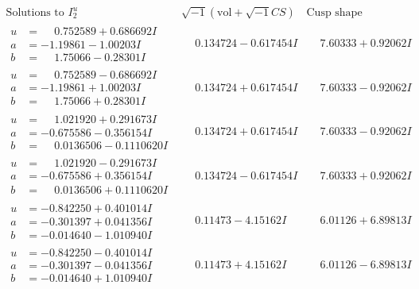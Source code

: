 \documentclass[1p]{elsarticle_modified}
\theoremstyle{definition}
\newcommand{\I}{\sqrt{-1}}
\begin{document}
$$\begin{array}{c|c|c}  
\text{Solutions to }I^u_{2}& \I (\text{vol} + \sqrt{-1}CS) & \text{Cusp shape}\\
 \hline 
\begin{aligned}
u &= \phantom{-}0.752589 + 0.686692 I \\
a &= -1.19861 - 1.00203 I \\
b &= \phantom{-}1.75066 - 0.28301 I\end{aligned}
 & \phantom{-}0.134724 - 0.617454 I & \phantom{-}7.60333 + 0.92062 I \\ \hline\begin{aligned}
u &= \phantom{-}0.752589 - 0.686692 I \\
a &= -1.19861 + 1.00203 I \\
b &= \phantom{-}1.75066 + 0.28301 I\end{aligned}
 & \phantom{-}0.134724 + 0.617454 I & \phantom{-}7.60333 - 0.92062 I \\ \hline\begin{aligned}
u &= \phantom{-}1.021920 + 0.291673 I \\
a &= -0.675586 - 0.356154 I \\
b &= \phantom{-}0.0136506 - 0.1110620 I\end{aligned}
 & \phantom{-}0.134724 + 0.617454 I & \phantom{-}7.60333 - 0.92062 I \\ \hline\begin{aligned}
u &= \phantom{-}1.021920 - 0.291673 I \\
a &= -0.675586 + 0.356154 I \\
b &= \phantom{-}0.0136506 + 0.1110620 I\end{aligned}
 & \phantom{-}0.134724 - 0.617454 I & \phantom{-}7.60333 + 0.92062 I \\ \hline\begin{aligned}
u &= -0.842250 + 0.401014 I \\
a &= -0.301397 + 0.041356 I \\
b &= -0.014640 - 1.010940 I\end{aligned}
 & \phantom{-}0.11473 - 4.15162 I & \phantom{-}6.01126 + 6.89813 I \\ \hline\begin{aligned}
u &= -0.842250 - 0.401014 I \\
a &= -0.301397 - 0.041356 I \\
b &= -0.014640 + 1.010940 I\end{aligned}
 & \phantom{-}0.11473 + 4.15162 I & \phantom{-}6.01126 - 6.89813 I \\ \hline\begin{aligned}

\end{aligned}
\end{array}$$
\end{document}
